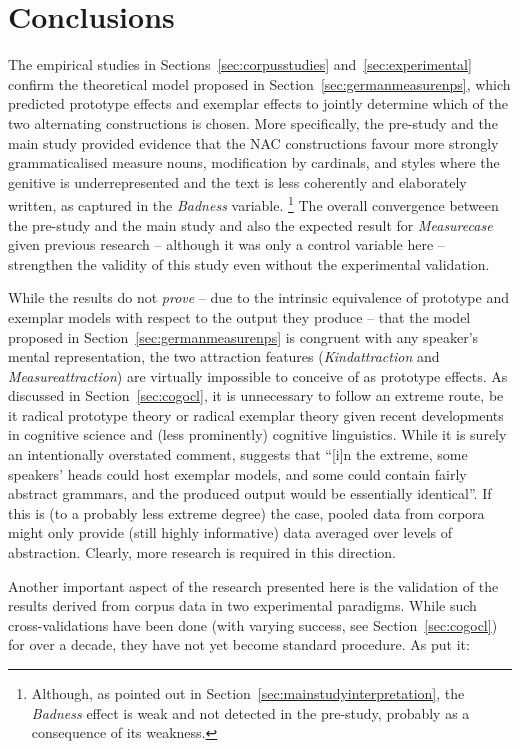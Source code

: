 \section{Conclusions}
\label{sec:conclusion}

The empirical studies in Sections~\ref{sec:corpusstudies} and~\ref{sec:experimental} confirm the theoretical model proposed in Section~\ref{sec:germanmeasurenps}, which predicted prototype effects and exemplar effects to jointly determine which of the two alternating constructions is chosen.
More specifically, the pre-study and the main study provided evidence that the NAC constructions favour more strongly grammaticalised measure nouns, modification by cardinals, and styles where the genitive is underrepresented and the text is less coherently and elaborately written, as captured in the \textit{Badness} variable.%
\footnote{Although, as pointed out in Section~\ref{sec:mainstudyinterpretation}, the \textit{Badness} effect is weak and not detected in the pre-study, probably as a consequence of its weakness.}
The overall convergence between the pre-study and the main study and also the expected result for \textit{Measurecase} given previous research \citep{Zimmer2015} -- although it was only a control variable here -- strengthen the validity of this study even without the experimental validation.

While the results do not \textit{prove} -- due to the intrinsic equivalence of prototype and exemplar models with respect to the output they produce -- that the model proposed in Section~\ref{sec:germanmeasurenps} is congruent with any speaker's mental representation, the two attraction features (\textit{Kindattraction} and \textit{Measureattraction}) are virtually impossible to conceive of as prototype effects.
As discussed in Section~\ref{sec:cogocl}, it is unnecessary to follow an extreme route, be it radical prototype theory or radical exemplar theory given recent developments in cognitive science and (less prominently) cognitive linguistics.
While it is surely an intentionally overstated comment, \citet[15]{Kapatsinski2014} suggests that ``[i]n the extreme, some speakers’ heads could host exemplar models, and some could contain fairly abstract grammars, and the produced output would be essentially identical''.
If this is (to a probably less extreme degree) the case, pooled data from corpora might only provide (still highly informative) data averaged over levels of abstraction.
Clearly, more research is required in this direction.

Another important aspect of the research presented here is the validation of the results derived from corpus data in two experimental paradigms.
While such cross-validations have been done (with varying success, see Section~\ref{sec:cogocl}) for over a decade, they have not yet become standard procedure.
As \citet[3--4]{DivjakEa2016a} put it:

